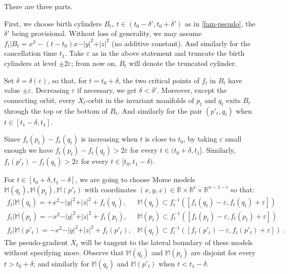 \documentclass[12pt]{amsart}
\def\R{\mathbb{R}}
\def\M{\mathbb{M}}
\def\de{\delta}
\def\ep{\varepsilon}
\def\nd{\noindent}
\begin{document}
   \nd {\bf Proof.}  There are three parts.
   
   \nd {\sc A) General setup.}  First, we choose birth cylinders $B_t, \ t\in (t_0-\de', t_0+\de')$ as in
   \ref{fam-pseudo}, the $\de'$ being provisional.
   Without loss of generality, we may assume $f_t\vert B_t= x^3-(t-t_0)x-\vert y\vert^2+\vert z\vert^2$ 
   (no additive constant). %
    And similarly for the cancellation 
   time $t_1$. Take  $\ep$ as in the above statement  and truncate the birth cylinders at level $\pm 2\ep$;
   from  now on, $B_t$  will denote the truncated cylinder.
    
    Set  $\de=\de(\ep)$, 
    so that, for $t=t_0+\de$, the two critical points of  $f_t$  in $B_t$ have value $\pm \ep$.
    Decreasing $\ep$ if necessary, we get  $\de<\de'$. %
   Moreover, %
    except the connecting orbit, every $X_t$-orbit in the invariant manifolds of $p_t$ and
    $q_t$ %
    exits $B_t$ through the top or the bottom of $B_t$. And similarly for the pair 
    $(p'_t, q_t)$ when $t\in [t_1-\de, t_1]$.
    
    Since $f_t(p_t)-f_t(q_t)$ is increasing when $t$ is close to $t_0$,  by taking $\ep$ small enough
     we have
    $f_t(p_t)-f_t(q_t)>2\ep$ for every $t\in (t_0+\de, t_1]$. Similarly, $f_t(p'_t)-f_t(q_t)>2\ep$ 
   for every $t\in [t_0, t_1-\de)$.
    
    For $t\in [t_0+\de,t_1-\de]$, we are going to choose Morse models $\M(q_t), \M(p_t),\M(p'_t)$
    with coordinates $(x,y,z)\in \R\times \R^i\times\R^{n-1-i}$ so that:
    $$\begin{array}{ll}
    f_t\vert\M(q_t)= +x^2-\vert y\vert^2+\vert z\vert^2+f_t(q_t),&\M(q_t)
    \subset f_t^{-1}\left([f_t(q_t)-\ep,f_t(q_t)+\ep]\right)\\
    f_t\vert\M(p_t)= -x^2-\vert y\vert^2+\vert z\vert^2+f_t(p_t),&\M(p_t)
    \subset f_t^{-1}\left([f_t(p_t)-\ep,f_t(p_t)+\ep]\right)\\
     f_t\vert\M(p'_t)= -x^2-\vert y\vert^2+\vert z\vert^2+f_t(p'_t),&\M(q_t)\subset f_t^{-1}\left([f_t(p'_t)-\ep,f_t(p'_t)+\ep]\right)\,.
    \end{array}
    $$
    The pseudo-gradient $X_t$ will be  tangent to the lateral boundary of these models without specifying more.
    Observe that 
    $\M(q_t)$ and $\M(p_t)$ are disjoint for every $t>t_0+\de$; and similarly for 
    $\M(q_t)$ and $\M(p'_t)$ when $t<t_1-\de$.  
    
\end{document}
